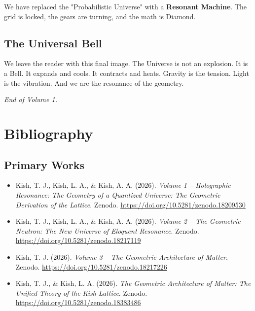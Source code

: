 \documentclass[11pt, letterpaper, openany]{book}
\begin{document}
We have replaced the "Probabilistic Universe" with a \textbf{Resonant Machine}. The grid is locked, the gears are turning, and the math is Diamond.

\section{The Universal Bell}
We leave the reader with this final image. The Universe is not an explosion. It is a Bell.
It expands and cools. It contracts and heats.
Gravity is the tension. Light is the vibration. And we are the resonance of the geometry.

\textit{End of Volume 1.}


\chapter*{Bibliography}


\section*{Primary Works}
\begin{itemize}
    \item Kish, T. J., Kish, L. A., \& Kish, A. A. (2026). \textit{Volume 1 -- Holographic Resonance: The Geometry of a Quantized Universe: The Geometric Derivation of the Lattice}. Zenodo. \url{https://doi.org/10.5281/zenodo.18209530}

    \item Kish, T. J., Kish, L. A., \& Kish, A. A. (2026). \textit{Volume 2 -- The Geometric Neutron: The New Universe of Eloquent Resonance}. Zenodo. \url{https://doi.org/10.5281/zenodo.18217119}

    \item Kish, T. J. (2026). \textit{Volume 3 -- The Geometric Architecture of Matter}. Zenodo. \url{https://doi.org/10.5281/zenodo.18217226}

    \item Kish, T. J., \& Kish, L. A. (2026). \textit{The Geometric Architecture of Matter: The Unified Theory of the Kish Lattice}. Zenodo. \url{https://doi.org/10.5281/zenodo.18383486}
\end{itemize}
\end{document}
